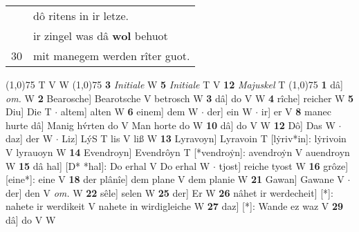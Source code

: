 \documentclass[8pt,a4paper,notitlepage]{article}
\begin{document}
\begin{table}[ht]
\begin{minipage}[t]{0.5\linewidth}
\begin{tabular}{rl}
 & dô ritens in ir letze.\\ 
 & ir zingel was dâ \textbf{wol} behuot\\ 
30 & mit manegem werden rîter guot.\\ 
\end{tabular}
\scriptsize
\line(1,0){75} \newline
T V W \newline
\line(1,0){75} \newline
\textbf{3} \textit{Initiale} W  \textbf{5} \textit{Initiale} T V  \textbf{12} \textit{Majuskel} T  \newline
\line(1,0){75} \newline
\textbf{1} dâ] \textit{om.} W \textbf{2} Bearosche] Bearotsche V betrosch W \textbf{3} dâ] do V W \textbf{4} rîche] reicher W \textbf{5} Diu] Die T  $\cdot$ altem] alten W \textbf{6} einem] dem W  $\cdot$ der] ein W  $\cdot$ ir] er V \textbf{8} manec hurte dâ] Manig hv́rten do V Man horte do W \textbf{10} dâ] do V W \textbf{12} Dô] Das W  $\cdot$ daz] der W  $\cdot$ Liz] LýS T lis V liß W \textbf{13} Lyravoyn] Lyravoin T [lẏriv*in]: lẏrivoin V lyrauoyn W \textbf{14} Evendroyn] Evendrôyn T [*vendroẏn]: avendroẏn V auendroyn W \textbf{15} dâ hal] [D* *hal]: Do erhal V Do erhal W  $\cdot$ tjost] reiche tyost W \textbf{16} grôze] [eine*]: eine V \textbf{18} der plânîe] dem plane V dem planie W \textbf{21} Gawan] Gawane V  $\cdot$ der] den V \textit{om.} W \textbf{22} sêle] selen W \textbf{25} der] Er W \textbf{26} nâhet ir werdecheit] [*]: nahete ir werdikeit V nahete in wirdigleiche W \textbf{27} daz] [*]: Wande ez waz V \textbf{29} dâ] do V W \newline
\end{minipage}
\end{table}
\end{document}
